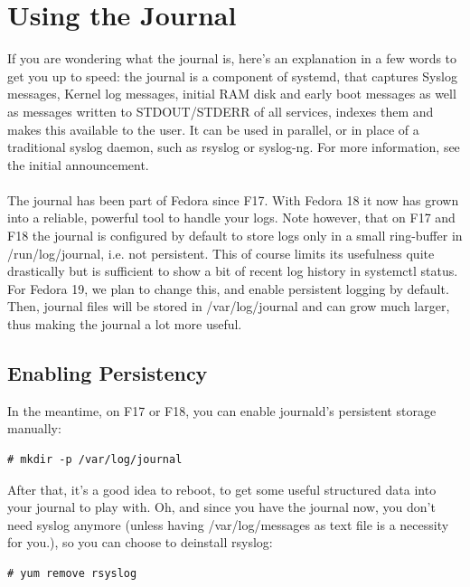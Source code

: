 \documentclass[titlepage]{article}
\begin{document}
\section{Using the Journal}
If you are wondering what the journal is, here's an explanation in a few words to get you up to speed: the journal is a component of systemd, that captures Syslog messages, Kernel log messages, initial RAM disk and early boot messages as well as messages written to STDOUT/STDERR of all services, indexes them and makes this available to the user. It can be used in parallel, or in place of a traditional syslog daemon, such as rsyslog or syslog-ng. For more information, see the initial announcement.
\\
\\
The journal has been part of Fedora since F17. With Fedora 18 it now has grown into a reliable, powerful tool to handle your logs. Note however, that on F17 and F18 the journal is configured by default to store logs only in a small ring-buffer in /run/log/journal, i.e. not persistent. This of course limits its usefulness quite drastically but is sufficient to show a bit of recent log history in systemctl status. For Fedora 19, we plan to change this, and enable persistent logging by default. Then, journal files will be stored in /var/log/journal and can grow much larger, thus making the journal a lot more useful.
\subsection{Enabling Persistency}
In the meantime, on F17 or F18, you can enable journald's persistent storage manually:
\begin{lstlisting}
# mkdir -p /var/log/journal
\end{lstlisting}
After that, it's a good idea to reboot, to get some useful structured data into your journal to play with. Oh, and since you have the journal now, you don't need syslog anymore (unless having /var/log/messages as text file is a necessity for you.), so you can choose to deinstall rsyslog:
\begin{lstlisting}
# yum remove rsyslog
\end{lstlisting}
\end{document}
